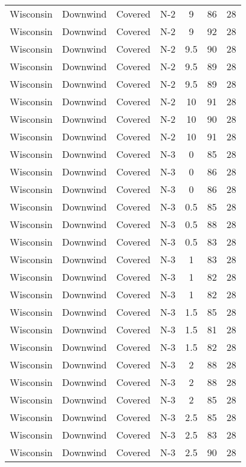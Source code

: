 \documentclass{article}
\begin{document}
\begin{longtable}[H]{ccccccc}
Wisconsin & Downwind & Covered     & N-2 & 9    & 86  & 28 \\
Wisconsin & Downwind & Covered     & N-2 & 9    & 92  & 28 \\
Wisconsin & Downwind & Covered     & N-2 & 9.5  & 90  & 28 \\
Wisconsin & Downwind & Covered     & N-2 & 9.5  & 89  & 28 \\
Wisconsin & Downwind & Covered     & N-2 & 9.5  & 89  & 28 \\
Wisconsin & Downwind & Covered     & N-2 & 10   & 91  & 28 \\
Wisconsin & Downwind & Covered     & N-2 & 10   & 90  & 28 \\
Wisconsin & Downwind & Covered     & N-2 & 10   & 91  & 28 \\
Wisconsin & Downwind & Covered     & N-3 & 0    & 85  & 28 \\
Wisconsin & Downwind & Covered     & N-3 & 0    & 86  & 28 \\
Wisconsin & Downwind & Covered     & N-3 & 0    & 86  & 28 \\
Wisconsin & Downwind & Covered     & N-3 & 0.5  & 85  & 28 \\
Wisconsin & Downwind & Covered     & N-3 & 0.5  & 88  & 28 \\
Wisconsin & Downwind & Covered     & N-3 & 0.5  & 83  & 28 \\
Wisconsin & Downwind & Covered     & N-3 & 1    & 83  & 28 \\
Wisconsin & Downwind & Covered     & N-3 & 1    & 82  & 28 \\
Wisconsin & Downwind & Covered     & N-3 & 1    & 82  & 28 \\
Wisconsin & Downwind & Covered     & N-3 & 1.5  & 85  & 28 \\
Wisconsin & Downwind & Covered     & N-3 & 1.5  & 81  & 28 \\
Wisconsin & Downwind & Covered     & N-3 & 1.5  & 82  & 28 \\
Wisconsin & Downwind & Covered     & N-3 & 2    & 88  & 28 \\
Wisconsin & Downwind & Covered     & N-3 & 2    & 88  & 28 \\
Wisconsin & Downwind & Covered     & N-3 & 2    & 85  & 28 \\
Wisconsin & Downwind & Covered     & N-3 & 2.5  & 85  & 28 \\
Wisconsin & Downwind & Covered     & N-3 & 2.5  & 83  & 28 \\
Wisconsin & Downwind & Covered     & N-3 & 2.5  & 90  & 28 \\

\end{longtable}
\end{document}
